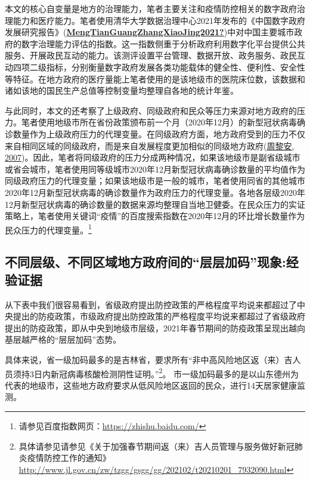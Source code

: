 \documentclass[
  12pt,
]{ctexart}
\begin{document}
本文的核心自变量是地方的治理能力，笔者主要关注和疫情防控相关的数字政府治理能力和医疗能力。笔者使用清华大学数据治理中心2021年发布的《中国数字政府发展研究报告》(\protect\hyperlink{ref-MengTianGuangZhangXiaoJing2021}{\textbf{MengTianGuangZhangXiaoJing2021?}})中对中国主要城市政府的数字治理能力评估的指数。这一指数侧重于分析政府利用数字化平台提供公共服务、开展政民互动的能力。该测评设置平台管理、数据开放、政务服务、政民互动四项二级指标，分别衡量数字政府发展各类功能载体的健全性、便利性、安全性等特征。在地方政府的医疗量能上笔者使用的是该地级市的医院床位数，该数据和诸如该地的国民生产总值等控制变量均整理自各地的统计年鉴。

与此同时，本文的还考察了上级政府、同级政府和民众等压力来源对地方政府的压力。笔者使用地级市所在省份政策颁布前一个月（2020年12月）的新型冠状病毒确诊数量作为上级政府压力的代理变量。在同级政府方面，地方政府受到的压力不仅来自相同区域的同级政府，而是来自发展程度更加相似的同级地方政府(\protect\hyperlink{ref-ZhouLiAn2007}{周黎安, 2007})。因此，笔者将同级政府的压力分成两种情况，如果该地级市是副省级城市或省会城市，笔者使用同等级城市2020年12月新型冠状病毒确诊数量的平均值作为同级政府压力的代理变量；如果该地级市是一般的城市，笔者使用同省的其他城市2020年12月新型冠状病毒的确诊数量作为政府压力的代理变量。各地各层级2020年12月新型冠状病毒的确诊数量的数据来源均整理自当地卫健委。在民众压力的实证策略上，笔者使用关键词``疫情''的百度搜索指数在2020年12月的环比增长数量作为民众压力的代理变量。\footnote{请参见百度指数网页：\url{https://zhishu.baidu.com/}}

\hypertarget{ux4e0dux540cux5c42ux7ea7ux4e0dux540cux533aux57dfux5730ux65b9ux653fux5e9cux95f4ux7684ux5c42ux5c42ux52a0ux7801ux73b0ux8c61ux7ecfux9a8cux8bc1ux636e}{%
\subsection{不同层级、不同区域地方政府间的``层层加码''现象:经验证据}\label{ux4e0dux540cux5c42ux7ea7ux4e0dux540cux533aux57dfux5730ux65b9ux653fux5e9cux95f4ux7684ux5c42ux5c42ux52a0ux7801ux73b0ux8c61ux7ecfux9a8cux8bc1ux636e}}

从下表中我们很容易看到，省级政府提出防控政策的严格程度平均说来都超过了中央提出的防疫政策，市级政府提出防控政策的严格程度平均说来都超过了省级政府提出的防疫政策，即从中央到地级市层级，2021年春节期间的防疫政策呈现出越向基层越严格的``层层加码''态势。

具体来说，省一级加码最多的是吉林省，要求所有``非中高风险地区返（来）吉人员须持3日内新冠病毒核酸检测阴性证明。''\footnote{具体请参见请参见《关于加强春节期间返（来）吉人员管理与服务做好新冠肺炎疫情防控工作的通知》\url{http://www.jl.gov.cn/zw/tzgg/gsgg/gg/202102/t20210201_7932090.html}}。 市一级加码最多的是以山东德州为代表的地级市，这些地方政府要求从低风险地区返回的民众，进行14天居家健康监测。
\end{document}
